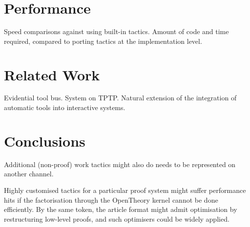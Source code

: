 \documentclass{llncs}
\begin{document}
\section{Performance}
\label{sec:performance}

Speed comparisons against using built-in tactics.
Amount of code and time required, compared to porting tactics at the implementation level.

\section{Related Work}

Evidential tool bus.
System on TPTP.
Natural extension of the integration of automatic tools into interactive systems.

\section{Conclusions}

Additional (non-proof) work tactics might also do needs to be represented on another channel.

Highly customised tactics for a particular proof system might suffer performance hits if the factorisation through the OpenTheory kernel cannot be done efficiently.
By the same token, the article format might admit optimisation by restructuring low-level proofs, and such optimisers could be widely applied.



\end{document}
